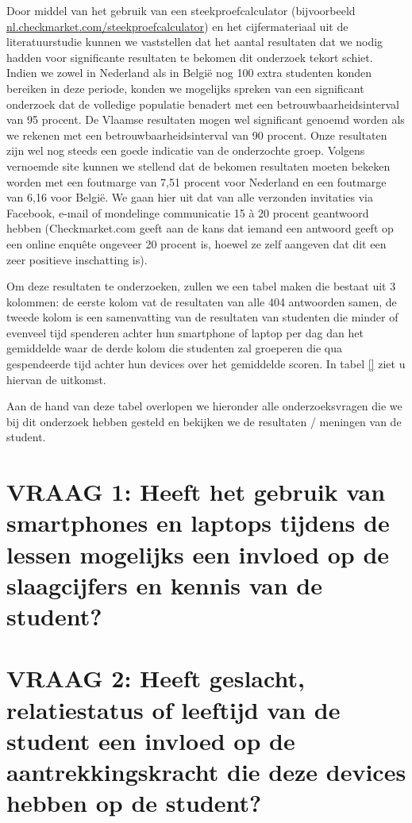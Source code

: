 Door middel van het gebruik van een steekproefcalculator (bijvoorbeeld \url{nl.checkmarket.com/steekproefcalculator}) en het cijfermateriaal uit de literatuurstudie kunnen we vaststellen dat het aantal resultaten dat we nodig hadden voor significante resultaten te bekomen dit onderzoek tekort schiet. Indien we zowel in Nederland als in België nog 100 extra studenten konden bereiken in deze periode, konden we mogelijks spreken van een significant onderzoek dat de volledige populatie benadert met een betrouwbaarheidsinterval van 95 procent. De Vlaamse resultaten mogen wel significant genoemd worden als we rekenen met een betrouwbaarheidsinterval van 90 procent. Onze resultaten zijn wel nog steeds een goede indicatie van de onderzochte groep. Volgens vernoemde site kunnen we stellend dat de bekomen resultaten moeten bekeken worden met een foutmarge van 7,51 procent voor Nederland en een foutmarge van 6,16 voor België. We gaan hier uit dat van alle verzonden invitaties via Facebook, e-mail of mondelinge communicatie 15 à 20 procent geantwoord hebben (Checkmarket.com geeft aan de kans dat iemand een antwoord geeft op een online enquête ongeveer 20 procent is, hoewel ze zelf aangeven dat dit een zeer positieve inschatting is).

Om deze resultaten te onderzoeken, zullen we een tabel maken die bestaat uit 3 kolommen: de eerste kolom vat de resultaten van alle 404 antwoorden samen, de tweede kolom is een samenvatting van de resultaten van studenten die minder of evenveel tijd spenderen achter hun smartphone of laptop per dag dan het gemiddelde waar de derde kolom die studenten zal groeperen die qua gespendeerde tijd achter hun devices over het gemiddelde scoren. In tabel \ref{} ziet u hiervan de uitkomst.

Aan de hand van deze tabel overlopen we hieronder alle onderzoeksvragen die we bij dit onderzoek hebben gesteld en bekijken we de resultaten / meningen van de student.

\section{VRAAG 1: Heeft het gebruik van smartphones en laptops tijdens de lessen mogelijks een invloed op de slaagcijfers en kennis van de student?}
\label{sec:hoofdvraag}


\section{VRAAG 2: Heeft geslacht, relatiestatus of leeftijd van de student een invloed op de aantrekkingskracht die deze devices hebben op de student?}
\label{sec:geslacht-leeftijd}


